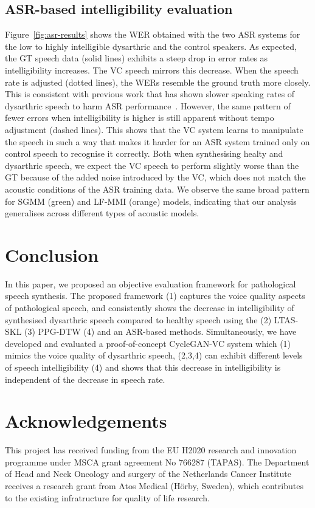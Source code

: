 \documentclass[a4paper]{article}
\begin{document}
\subsection{ASR-based intelligibility evaluation}
\label{sec:asr-results}

Figure~\ref{fig:asr-results} shows the WER obtained with the two ASR
systems for the low to highly intelligible dysarthric and the control speakers. As expected, the
GT speech data (solid lines) exhibits a steep drop in error rates as intelligibility
increases. The VC speech mirrors this decrease. When the speech rate is adjusted (dotted lines), the WERs resemble the ground
truth more closely. This is consistent with previous work that has shown slower speaking rates of dysarthric speech to harm ASR
performance~\cite{rudzicz2013adjusting}. However, the same pattern of fewer errors when intelligibility is higher is still apparent without tempo adjustment (dashed lines). This shows that the VC system
learns to manipulate the speech in such a way that makes it harder for an ASR
system trained only on control speech to recognise it correctly. Both when synthesising healty and dysarthric speech,
we expect the VC speech to perform slightly worse than the GT
because of the added noise introduced by the VC, which does not match the acoustic conditions of the ASR
training data. We observe the same broad pattern for SGMM (green) and LF-MMI (orange) models, indicating that our analysis generalises across different types of acoustic models.

\section{Conclusion}


In this paper, we proposed an objective evaluation framework for pathological speech synthesis. The proposed framework (1) captures the voice quality aspects of pathological speech, and consistently shows the decrease in intelligibility of synthesised dysarthric speech compared to healthy speech using the (2) LTAS-SKL (3) PPG-DTW (4) and an ASR-based methods. Simultaneously, we have developed and evaluated a proof-of-concept CycleGAN-VC system which (1) mimics the voice quality of dysarthric speech, (2,3,4) can exhibit different levels of speech intelligibility (4) and shows that this decrease in intelligibility is independent of the decrease in speech rate.

\section{Acknowledgements}
This  project  has  received  funding  from  the  EU H2020 research and innovation programme under MSCA grant  agreement  No  766287 (TAPAS).   The  Department of Head and Neck Oncology and surgery of the Netherlands Cancer Institute receives a research grant from Atos Medical (H\"orby, Sweden), which contributes to the existing infratructure for quality of life research.


\newpage
\small




\end{document}
